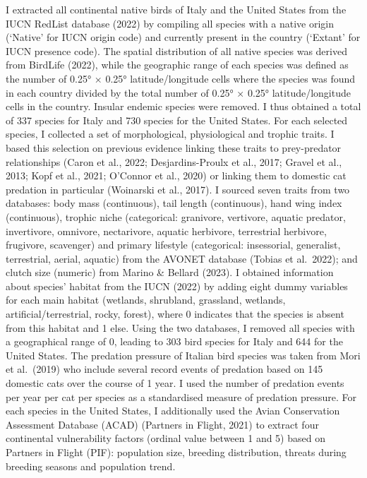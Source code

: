 \documentclass[
  super,
  review,
  3p]{elsarticle}
\begin{document}
I extracted all continental native birds of Italy and the United States
from the IUCN RedList database (2022) by compiling all species with a
native origin (`Native' for IUCN origin code) and currently present in
the country (`Extant' for IUCN presence code). The spatial distribution
of all native species was derived from BirdLife (2022), while the
geographic range of each species was defined as the number of 0.25° ×
0.25° latitude/longitude cells where the species was found in each
country divided by the total number of 0.25° × 0.25° latitude/longitude
cells in the country. Insular endemic species were removed. I thus
obtained a total of 337 species for Italy and 730 species for the United
States. For each selected species, I collected a set of morphological,
physiological and trophic traits. I based this selection on previous
evidence linking these traits to prey-predator relationships (Caron et
al., 2022; Desjardins-Proulx et al., 2017; Gravel et al., 2013; Kopf et
al., 2021; O'Connor et al., 2020) or linking them to domestic cat
predation in particular (Woinarski et al., 2017). I sourced seven traits
from two databases: body mass (continuous), tail length (continuous),
hand wing index (continuous), trophic niche (categorical: granivore,
vertivore, aquatic predator, invertivore, omnivore, nectarivore, aquatic
herbivore, terrestrial herbivore, frugivore, scavenger) and primary
lifestyle (categorical: insessorial, generalist, terrestrial, aerial,
aquatic) from the AVONET database (Tobias et al.~2022); and clutch size
(numeric) from Marino \& Bellard (2023). I obtained information about
species' habitat from the IUCN (2022) by adding eight dummy variables
for each main habitat (wetlands, shrubland, grassland, wetlands,
artificial/terrestrial, rocky, forest), where 0 indicates that the
species is absent from this habitat and 1 else. Using the two databases,
I removed all species with a geographical range of 0, leading to 303
bird species for Italy and 644 for the United States. The predation
pressure of Italian bird species was taken from Mori et al.~(2019) who
include several record events of predation based on 145 domestic cats
over the course of 1 year. I used the number of predation events per
year per cat per species as a standardised measure of predation
pressure. For each species in the United States, I additionally used the
Avian Conservation Assessment Database (ACAD) (Partners in Flight, 2021)
to extract four continental vulnerability factors (ordinal value between
1 and 5) based on Partners in Flight (PIF): population size, breeding
distribution, threats during breeding seasons and population trend.
\end{document}

